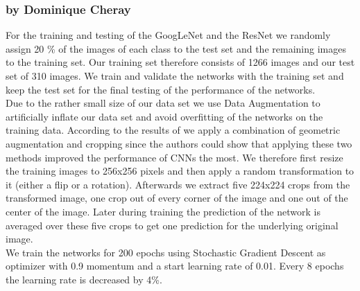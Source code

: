 \documentclass[11pt]{report}
\begin{document}
\subsubsection{by Dominique Cheray}
For the training and testing of the GoogLeNet and the ResNet we randomly
assign 20 \% of the images of each class to the test set and the remaining
images to the training set. Our training set therefore consists of 1266 images
and our test set of 310 images. We train and validate the networks with the
training set and keep the test set for the final testing of the performance
of the networks. \\
Due to the rather small size of our data set we use Data Augmentation to
artificially inflate our data set and avoid overfitting of the networks on the
training data. According to the results of \cite{taylor2017imporving} we apply
a combination of geometric augmentation and cropping since the authors could
show that applying these two methods improved the performance of CNNs
the most. We therefore first resize the training images to 256x256 pixels and
then apply a random transformation to it (either a flip or a rotation).
Afterwards we extract five 224x224 crops from the transformed image, one crop
out of every corner of the image and one out of the center of the image. Later
during training the prediction of the network is averaged over these five crops
to get one prediction for the underlying original image. \\
We train the networks for 200 epochs using Stochastic Gradient Descent as
optimizer with 0.9 momentum and a start learning rate of 0.01. Every 8 epochs
the learning rate is decreased by 4\%. 



\end{document}
